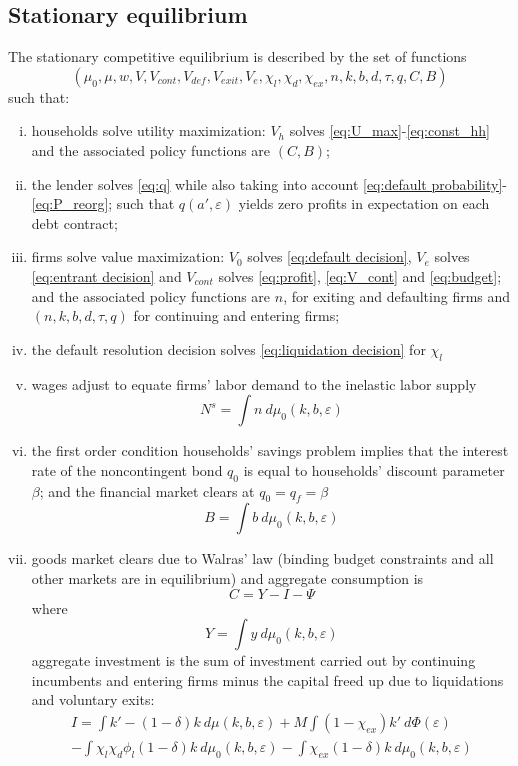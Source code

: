 \documentclass[12pt]{article}
\begin{document}
\subsection{Stationary equilibrium}\label{sec:eq}
The stationary competitive equilibrium is described by the set of functions
$$(\mu_0, \mu, w, V, V_{cont}, V_{def}, V_{exit}, V_e, \chi_l, \chi_d, \chi_{ex}, n,k,b,d,\tau,q, C, B)$$
such that: 
\begin{enumerate}[(i)]
\item households solve utility maximization: $V_h$ solves \ref{eq:U_max}-\ref{eq:const_hh} and the associated policy functions are $(C, B)$;
\item the lender solves \ref{eq:q} while also taking into account \ref{eq:default probability}-\ref{eq:P_reorg}; such that $q(a',\varepsilon)$ yields zero profits in expectation on each debt contract;
\item firms solve value maximization: $V_0$ solves \ref{eq:default decision}, $V_e$ solves \ref{eq:entrant decision} and $V_{cont}$ solves \ref{eq:profit}, \ref{eq:V_cont} and \ref{eq:budget}; and the associated policy functions are $n$, for exiting and defaulting firms and $(n,k,b,d,\tau,q)$ for continuing and entering firms;
\item the default resolution decision solves \ref{eq:liquidation decision}  for $\chi_l$
\item wages adjust to equate firms' labor demand to the inelastic labor supply
$$ N^s = \int n  \ d \mu_0 (k,b,\varepsilon)  $$
\item the first order condition households' savings problem implies that the interest rate of the noncontingent bond $q_0$ is equal to households' discount parameter $\beta$; and the financial market clears at $q_0 = q_f = \beta$
 $$ B = \int b \ d \mu_0 (k,b,\varepsilon) $$
\item goods market clears due to Walras' law (binding budget constraints and all other markets are in equilibrium) and aggregate consumption is
 $$ C = Y - I - \Psi$$
where
 $$ Y =  \int y \ d \mu_0 (k,b,\varepsilon) $$
aggregate investment is the sum of investment carried out by continuing incumbents and entering firms minus the capital freed up due to liquidations and voluntary exits:
\begin{multline*} 
    I = \int   k' -(1-\delta)k \ d \mu (k,b,\varepsilon) + M \int (1-\chi_{ex}) k' \ d \Phi(\varepsilon)    \\
   -  \int   \chi_l \chi_d \phi_l (1-\delta)k \ d \mu_0 (k,b,\varepsilon) - \int \chi_{ex} (1-\delta) k \ d \mu_0 (k,b,\varepsilon)   

\end{multline*}
\end{enumerate}
\end{document}

